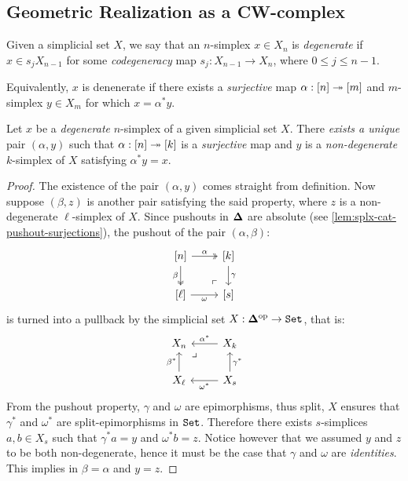 \subsection{Geometric Realization as a CW-complex}

\begin{definition}
\label{def:degenerate-n-simplex}
Given a simplicial set \(X\), we say that an \(n\)-simplex \(x \in X_n\) is
\emph{degenerate} if \(x \in s_j X_{n-1}\) for some \emph{codegeneracy} map
\(s_j: X_{n-1} \to X_n\), where \(0 \leq j \leq n-1\).

Equivalently, \(x\) is denenerate if there exists a \emph{surjective} map
\(\alpha: [n] \twoheadrightarrow [m]\) and \(m\)-simplex \(y \in X_m\) for which
\(x = \alpha^{*} y\).
\end{definition}

\begin{lemma}
\label{lem:Eilenberg-Zilber}
Let \(x\) be a \emph{degenerate} \(n\)-simplex of a given simplicial set
\(X\). There \emph{exists a unique} pair \((\alpha, y)\) such that
\(\alpha: [n] \twoheadrightarrow [k]\) is a \emph{surjective} map and \(y\) is a
\emph{non-degenerate} \(k\)-simplex of \(X\) satisfying \(\alpha^{*} y = x\).
\end{lemma}

\begin{proof}
The existence of the pair \((\alpha, y)\) comes straight from definition. Now
suppose \((\beta, z)\) is another pair satisfying the said property, where \(z\)
is a non-degenerate \(\ell\)-simplex of \(X\). Since pushouts in \({\mathbf{\Delta}}\) are
absolute (see \cref{lem:splx-cat-pushout-surjections}), the pushout of the pair
\((\alpha, \beta)\):
\[
\begin{tikzcd}
{[n]} \ar[r, two heads, "\alpha"]
\ar[d, two heads, "\beta"']
\ar[dr, phantom, "\ulcorner", very near end]
&{[k]} \ar[d, "\gamma"] \\
{[\ell]} \ar[r, "\omega"'] &{[s]}
\end{tikzcd}
\]
is turned into a pullback by the simplicial set \(X: {\mathbf{\Delta}}^{\mathrm{op}} \to {\texttt{Set}}\),
that is:
\[
\begin{tikzcd}
X_n \ar[rd, phantom, very near start, "\lrcorner"]
&X_k \ar[l, "\alpha^{*}"']
\\
X_{\ell} \ar[u, "\beta^{*}"]
&X_s \ar[u, "\gamma^{*}"'] \ar[l, "\omega^{*}"]
\end{tikzcd}
\]
From the pushout property, \(\gamma\) and \(\omega\) are epimorphisms, thus
split, \(X\) ensures that \(\gamma^{*}\) and \(\omega^{*}\) are
split-epimorphisms in \({\texttt{Set}}\). Therefore there exists \(s\)-simplices
\(a, b \in X_s\) such that \(\gamma^{*} a = y\) and \(\omega^{*} b = z\). Notice
however that we assumed \(y\) and \(z\) to be both non-degenerate, hence it must
be the case that \(\gamma\) and \(\omega\) are \emph{identities}. This implies
in \(\beta = \alpha\) and \(y = z\).
\end{proof}


